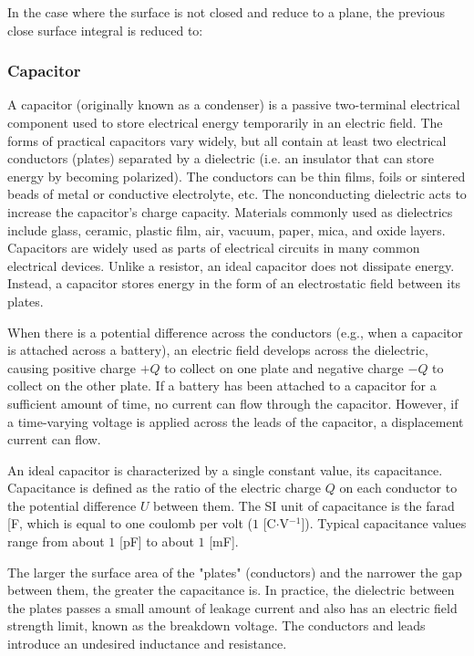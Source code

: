 	In the case where the surface is not closed and reduce to a plane, the previous close surface integral is reduced to:
	
	
	\subsubsection{Capacitor}
	A capacitor (originally known as a condenser) is a passive two-terminal electrical component used to store electrical energy temporarily in an electric field. The forms of practical capacitors vary widely, but all contain at least two electrical conductors (plates) separated by a dielectric (i.e. an insulator that can store energy by becoming polarized). The conductors can be thin films, foils or sintered beads of metal or conductive electrolyte, etc. The nonconducting dielectric acts to increase the capacitor's charge capacity. Materials commonly used as dielectrics include glass, ceramic, plastic film, air, vacuum, paper, mica, and oxide layers. Capacitors are widely used as parts of electrical circuits in many common electrical devices. Unlike a resistor, an ideal capacitor does not dissipate energy. Instead, a capacitor stores energy in the form of an electrostatic field between its plates.

	When there is a potential difference across the conductors (e.g., when a capacitor is attached across a battery), an electric field develops across the dielectric, causing positive charge $+Q$ to collect on one plate and negative charge $-Q$ to collect on the other plate. If a battery has been attached to a capacitor for a sufficient amount of time, no current can flow through the capacitor. However, if a time-varying voltage is applied across the leads of the capacitor, a displacement current can flow.

An ideal capacitor is characterized by a single constant value, its capacitance. Capacitance is defined as the ratio of the electric charge $Q$ on each conductor to the potential difference $U$ between them. The SI unit of capacitance is the farad [F, which is equal to one coulomb per volt ($1$ [C$\cdot$V$^{-1}$]). Typical capacitance values range from about $1$ [pF] to about $1$ [mF].

	The larger the surface area of the "plates" (conductors) and the narrower the gap between them, the greater the capacitance is. In practice, the dielectric between the plates passes a small amount of leakage current and also has an electric field strength limit, known as the breakdown voltage. The conductors and leads introduce an undesired inductance and resistance.

